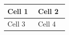 \par\medskip
\begin{longtable}{|p{0.45\linewidth}|p{0.45\linewidth}|}
\hline
Cell 1

 & Cell 2

 \\
\hline
Cell 3

 & Cell 4

 \\
\hline
\end{longtable}
\medskip


